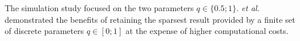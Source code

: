 The simulation study focused on
the two parameters $q \in \{ 0.5; 1 \}$.
 \emph{et al.} \cite[Sect. 5]{article:FoucartACHA2009} demonstrated
the benefits of retaining
the sparsest result provided by
a finite set of
discrete parameters
$q \in [ 0; 1 ]$ at the expense of
higher computational costs.

